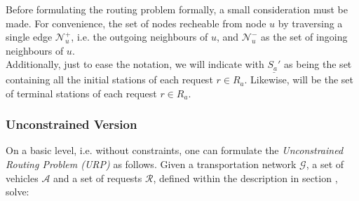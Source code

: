 Before formulating the routing problem formally, a small consideration must be made. For convenience, the set of nodes recheable from node $u$ by traversing a single edge $\mathcal{N}^+_u$, i.e. the outgoing neighbours of $u$, and $\mathcal{N}^-_u$ as the set of ingoing neighbours of $u$.\\ Additionally, just to ease the notation, we will indicate with $\underline{S_a'}$ as being the set containing all the initial stations of each request $r \in R_a$. Likewise,  will be the set of terminal stations of each request $r \in R_a$. \\

\subsubsection*{Unconstrained Version}

On a basic level, i.e. without constraints, one can formulate the \textit{Unconstrained Routing Problem (URP)} as follows. Given a transportation network $\mathcal{G}$, a set of vehicles $\mathcal{A}$ and a set of requests $\mathcal{R}$, defined within the description in section , solve:

